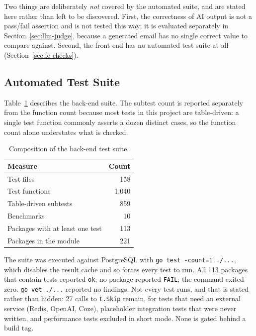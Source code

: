 \documentclass[a4paper]{article}
\begin{document}
Two things are deliberately \emph{not} covered by the automated suite, and are
stated here rather than left to be discovered. First, the correctness of AI
output is not a pass/fail assertion and is not tested this way; it is evaluated
separately in Section~\ref{sec:llm-judge}, because a generated email has no
single correct value to compare against. Second, the front end has no automated
test suite at all (Section~\ref{sec:fe-checks}).

\subsection{Automated Test Suite}

Table~\ref{tab:suite-composition} describes the back-end suite. The subtest
count is reported separately from the function count because most tests in this
project are table-driven: a single test function commonly asserts a dozen
distinct cases, so the function count alone understates what is checked.

\begin{table}[H]
\centering
\caption{Composition of the back-end test suite.}
\label{tab:suite-composition}
\small
\begin{tabular}{|p{6cm}|r|}
\hline
\textbf{Measure} & \textbf{Count} \\
\hline
Test files & 158 \\
\hline
Test functions & 1{,}040 \\
\hline
Table-driven subtests & 859 \\
\hline
Benchmarks & 10 \\
\hline
Packages with at least one test & 113 \\
\hline
Packages in the module & 221 \\
\hline
\end{tabular}
\end{table}

The suite was executed against PostgreSQL with \texttt{go test -count=1 ./...},
which disables the result cache and so forces every test to run. All 113
packages that contain tests reported \texttt{ok}; no package reported
\texttt{FAIL}; the command exited zero. \texttt{go vet ./...} reported no
findings. Not every test runs, and that is stated rather than hidden: 27 calls
to \texttt{t.Skip} remain, for tests that need an external service (Redis,
OpenAI, Coze), placeholder integration tests that were never written, and
performance tests excluded in short mode. None is gated behind a build tag.
\end{document}
